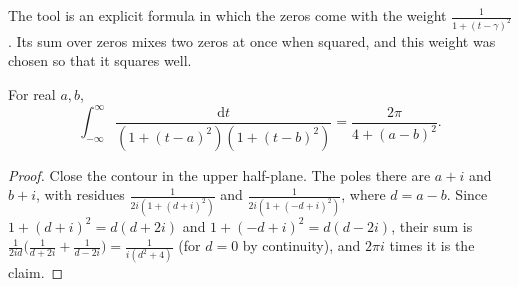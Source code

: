 The tool is an explicit formula in which the zeros come with the weight $\frac1{1+(t-\gamma)^2}$. Its sum over zeros mixes two zeros at once when squared, and this weight was chosen so that it squares well.

\begin{lemma}\label{lem:cauchykernels}
For real $a,b$,
\[
\int_{-\infty}^\infty\frac{\mathrm dt}{(1+(t-a)^2)(1+(t-b)^2)}=\frac{2\pi}{4+(a-b)^2}.
\]
\end{lemma}
\begin{proof}
Close the contour in the upper half-plane. The poles there are $a+i$ and $b+i$, with residues $\frac1{2i(1+(d+i)^2)}$ and $\frac1{2i(1+(-d+i)^2)}$, where $d=a-b$. Since $1+(d+i)^2=d(d+2i)$ and $1+(-d+i)^2=d(d-2i)$, their sum is $\frac1{2id}\bigl(\frac1{d+2i}+\frac1{d-2i}\bigr)=\frac1{i(d^2+4)}$ (for $d=0$ by continuity), and $2\pi i$ times it is the claim.
\end{proof}

